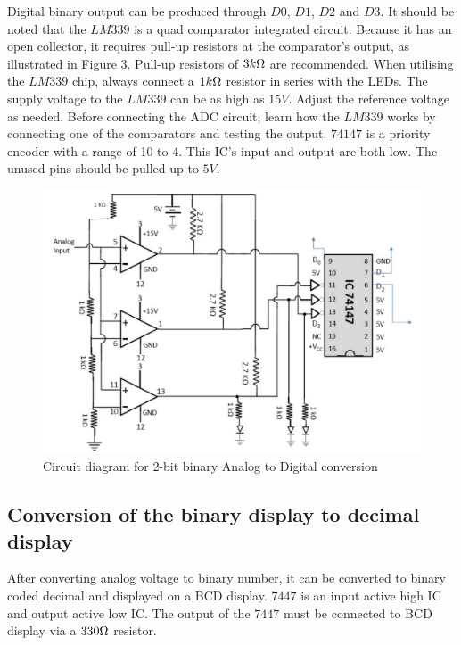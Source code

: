 		Digital binary output can be produced through $D0$, $D1$, $D2$ and $D3$. It should be noted that the $LM339$ is a quad comparator integrated circuit. Because it has an open collector, it requires pull-up resistors at the comparator's output, as illustrated in \hyperref[obj:2]{Figure 3}. Pull-up resistors of $3k\ohm$ are recommended. When utilising the $LM339$ chip, always connect a $1k\ohm$ resistor in series with the LEDs. The supply voltage to the $LM339$ can be as high as $15V$. Adjust the reference voltage as needed. Before connecting the ADC circuit, learn how the $LM339$ works by connecting one of the comparators and testing the output. $74147$ is a priority encoder with a range of 10 to 4. This IC's input and output are both low. The unused pins should be pulled up to $5V$.
		\begin{figure}[H]
			\centering
			\label{obj:2}
			\includegraphics[width=0.8\columnwidth]{images/th2.png}
			\caption{ Circuit diagram for 2-bit binary Analog to Digital conversion }
		\end{figure}

	\subsection{Conversion of the binary display to decimal display}
		After converting analog voltage to binary number, it can be converted to binary coded decimal and displayed on a BCD display. $7447$ is an input active high IC and output active low IC. The output of the $7447$ must be connected to BCD display via a $330\ohm$ resistor.
